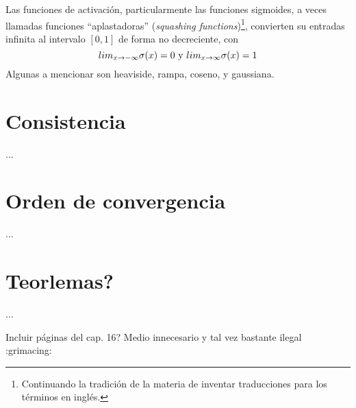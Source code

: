 \documentclass[12pt]{extarticle}
\newenvironment{comentarios_meta}
    {\begin{framed}\noindent\textcolor{red}{\textbf{//}}}
    {\end{framed}}
\begin{document}
    Las funciones de activación, particularmente las funciones sigmoides, a veces llamadas funciones ``aplastadoras'' (\textit{squashing functions})\footnote{Continuando la tradición de la materia de inventar traducciones para los términos en inglés.}, convierten su entradas infinita al intervalo $[0,1]$ de forma no decreciente, con
    \begin{equation*}
        lim_{x \to -\infty} \sigma(x) = 0 \textnormal{ y } lim_{x \to \infty} \sigma(x) = 1
    \end{equation*}
    Algunas a mencionar son heaviside, rampa, coseno, y gaussiana.
    

\section{Consistencia}

    ...


\section{Orden de convergencia}

    ...
    

\section{Teorlemas?}

    ...




% 
% 


\begin{comentarios_meta}
    Incluir páginas del cap. 16? Medio innecesario y tal vez bastante ilegal :grimacing:
\end{comentarios_meta}
\end{document}
